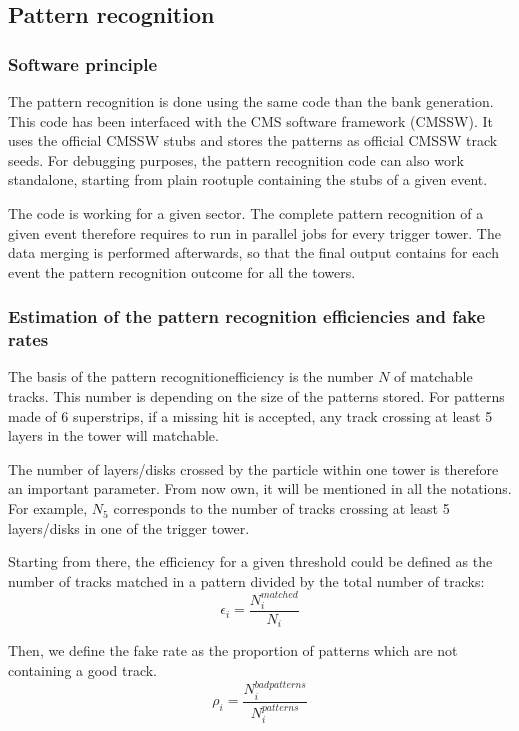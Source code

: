 \subsection{Pattern recognition}

\subsubsection{Software principle}

\noindent The pattern recognition is done using the same code than the bank generation. This code has been interfaced with the CMS software framework (CMSSW). It uses the official CMSSW stubs and stores the patterns as official CMSSW track seeds. For debugging purposes, the pattern recognition code can also work standalone, starting from plain rootuple containing the stubs of a given event. 

\noindent The code is working for a given sector. The complete pattern recognition of a given event therefore requires to run in parallel jobs for every trigger tower. The data merging is performed afterwards, so that the final output contains for each event the pattern recognition outcome for all the towers. 


\subsubsection{Estimation of the pattern recognition efficiencies and fake rates}

\noindent The basis of the pattern recognitionefficiency is the number $N$ of matchable tracks. This number is depending on the size of the patterns stored. For patterns made of 6 superstrips, if a missing hit is accepted, any track crossing at least 5 layers in the tower will matchable. 

\noindent The number of layers/disks crossed by the particle within one tower is therefore an important parameter. From now own, it will be mentioned in all the notations. For example, $N_{5}$ corresponds to the number of tracks crossing at least 5 layers/disks in one of the trigger tower.

\noindent Starting from there, the efficiency for a given threshold could be defined as the number of tracks matched in a pattern divided by the total number of tracks: 
\begin{equation}
\epsilon_i = \frac{N^{matched}_i}{N_i}
\end{equation} 

\noindent Then, we define the fake rate as the proportion of patterns which are not containing a good track. 
\begin{equation}
\rho_i = \frac{N^{bad patterns}_{i}}{N^{patterns}_{i}}
\end{equation} 

